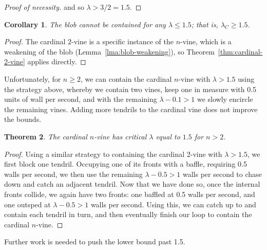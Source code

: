 \documentclass[12pt]{article}
\theoremstyle{plain}
\newtheorem{theorem}{Theorem}
\newtheorem{corollary}[theorem]{Corollary}
\theoremstyle{definition}
\begin{document}
\begin{proof}[Proof of necessity]
and so \(\lambda > 3/2=1.5\).
\end{proof}



\begin{corollary}
\label{cor:main}
The blob cannot be contained for any \(\lambda\leq 1.5\); that is, \(\lambda_C\geq 1.5\).
\end{corollary}
\begin{proof}
The cardinal \(2\)-vine is a specific instance of the \(n\)-vine, which is a weakening of the blob (Lemma~\ref{lma:blob-weakening}), so Theorem~\ref{thm:cardinal-2-vine} applies directly.
\end{proof}


Unfortunately, for \(n\geq 2\), we can contain the cardinal \(n\)-vine with \(\lambda>1.5\) using the strategy above, whereby we contain two vines, keep one in measure with 0.5 units of wall per second, and with the remaining \(\lambda-0.1>1\) we slowly encircle the remaining vines. Adding more tendrils to the cardinal vine does not improve the bounds.


\begin{theorem}
\label{thm:cardinal-n-vine}
The cardinal \(n\)-vine has critical \(\lambda\) equal to \(1.5\) for \(n>2\). 
\end{theorem}
\begin{proof}[Proof]
Using a similar strategy to containing the cardinal 2-vine with \(\lambda>1.5\), we first block one tendril. Occupying one of its fronts with a baffle, requiring 0.5 walls per second, we then use the remaining \(\lambda-0.5>1\) walls per second to chase down and catch an adjacent tendril. Now that we have done so, once the internal fronts collide, we again have two fronts: one baffled at 0.5 walls per second, and one outsped at \(\lambda-0.5>1\) walls per second. Using this, we can catch up to and contain each tendril in turn, and then eventually finish our loop to contain the cardinal \(n\)-vine.
\end{proof}

Further work is needed to push the lower bound past 1.5.
\end{document}
